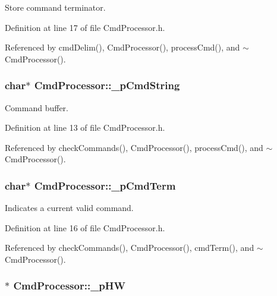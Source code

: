 Store command terminator. 



Definition at line 17 of file CmdProcessor.h.



Referenced by cmdDelim(), CmdProcessor(), processCmd(), and $\sim$CmdProcessor().

\hypertarget{class_cmd_processor_acc77d1f9a20e535e1073950001c0cc36}{
\subsubsection[{\_\-pCmdString}]{\setlength{\rightskip}{0pt plus 5cm}char$\ast$ {\bf CmdProcessor::\_\-pCmdString}}}
\label{class_cmd_processor_acc77d1f9a20e535e1073950001c0cc36}


Command buffer. 



Definition at line 13 of file CmdProcessor.h.



Referenced by checkCommands(), CmdProcessor(), processCmd(), and $\sim$CmdProcessor().

\hypertarget{class_cmd_processor_ac3499e23267a4f54dc409e51555d4b26}{
\subsubsection[{\_\-pCmdTerm}]{\setlength{\rightskip}{0pt plus 5cm}char$\ast$ {\bf CmdProcessor::\_\-pCmdTerm}}}
\label{class_cmd_processor_ac3499e23267a4f54dc409e51555d4b26}


Indicates a current valid command. 



Definition at line 16 of file CmdProcessor.h.



Referenced by checkCommands(), CmdProcessor(), cmdTerm(), and $\sim$CmdProcessor().

\hypertarget{class_cmd_processor_a8df6f12b27223c1f1876ea7221cd2413}{
\subsubsection[{\_\-pHW}]{$\ast$ {\bf CmdProcessor::\_\-pHW}}}
\label{class_cmd_processor_a8df6f12b27223c1f1876ea7221cd2413}



